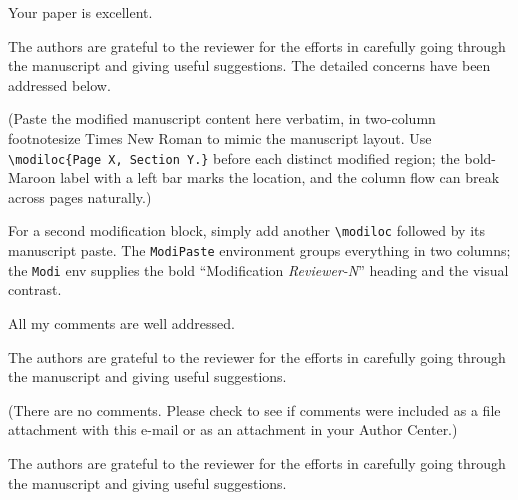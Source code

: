 \documentclass{response}
\begin{document}
\begin{R2R}
    \begin{Comment}
    Your paper is excellent.
    \end{Comment}
    \begin{Response}
    The authors are grateful to the reviewer for the efforts in carefully going through the manuscript and giving useful suggestions. The detailed concerns have been addressed below.\cite{Shu1998}
    \end{Response}
    \begin{Modi}
    \begin{ModiPaste}

    \noindent (Paste the modified manuscript content here verbatim, in two-column footnotesize Times New Roman to mimic the manuscript layout. Use \texttt{\textbackslash modiloc\{Page X, Section Y.\}} before each distinct modified region; the bold-Maroon label with a left bar marks the location, and the column flow can break across pages naturally.)


    \noindent For a second modification block, simply add another \texttt{\textbackslash modiloc} followed by its manuscript paste. The \texttt{ModiPaste} environment groups everything in two columns; the \texttt{Modi} env supplies the bold ``Modification \emph{Reviewer-N}'' heading and the visual contrast.
    \end{ModiPaste}
    \end{Modi}

\end{R2R}

\begin{R2R}
    \begin{Comment}
        All my comments are well addressed.
    \end{Comment}
    \begin{Response}
        The authors are grateful to the reviewer for the efforts in carefully going through the manuscript and giving useful suggestions.
    \end{Response}
\end{R2R}

\begin{R2R}
    \begin{Comment}
        (There are no comments. Please check to see if comments were included as a file attachment with this e-mail or as an attachment in your Author Center.)
    \end{Comment}
    \begin{Response}
        The authors are grateful to the reviewer for the efforts in carefully going through the manuscript and giving useful suggestions.
    \end{Response}
\end{R2R}

\clearpage
\printbibliography
\end{document}
